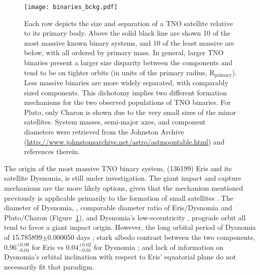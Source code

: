 \documentclass[onecolumn]{aastex631}
\begin{document}
\begin{figure}[ht!]
\begin{center}
\texttt{[image: binaries\_bckg.pdf]}
\caption{Each row depicts the size and separation of a TNO satellite relative to its primary body.
Above the solid black line are shown 10 of the most massive known binary systems, and 10 of the least massive are below, with all ordered by primary mass. In general, larger TNO binaries present a larger size disparity between the components and tend to be on tighter orbits (in units of the primary radius, R$_{\mathrm{primary}}$). Less massive binaries are more widely separated, with comparably sized components. This dichotomy implies two different formation mechanisms for the two observed populations of TNO binaries. For Pluto, only Charon is shown due to the very small sizes of the minor satellites. System masses, semi-major axes, and component diameters were retrieved from the Johnston Archive (\url{http://www.johnstonsarchive.net/astro/astmoontable.html}) and references therein.\label{binaries}}
\end{center}
\end{figure}

The origin of the most massive TNO binary system, (136199) Eris and its satellite Dysnomia, is still under investigation. The giant impact and capture mechanisms are the more likely options, given that the \citet{Weidenschilling2002} mechanism mentioned previously is applicable primarily to the formation of small satellites \citep{Brunini2020}. The diameter of Dysnomia, \citep[700$\pm$115 km;][]{BB2018}, comparable diameter ratio of Eris/Dysnomia and Pluto/Charon (Figure~\ref{binaries}), and Dysnomia's low-eccentricity \citep[$e=0.0062\pm0.0010$;][]{H21}, prograde orbit all tend to favor a giant impact origin. However, the long orbital period of Dysnomia of 15.785899$\pm$0.000050 days \citep{H21}; stark albedo contrast between the two components, 0.96$^{+0.09}_{-0.04}$ for Eris \citep{Sicardy} vs 0.04$^{+0.02}_{-0.01}$ for Dysnomia \citep{BB2018}; and lack of information on Dysnomia's orbital inclination with respect to Eris' equatorial plane do not necessarily fit that paradigm.
\end{document}
